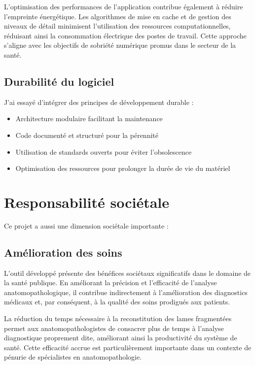 \documentclass[11pt,a4paper]{report}
\begin{document}
L'optimisation des performances de l'application contribue également à réduire l'empreinte énergétique. Les algorithmes de mise en cache et de gestion des niveaux de détail minimisent l'utilisation des ressources computationnelles, réduisant ainsi la consommation électrique des postes de travail. Cette approche s'aligne avec les objectifs de sobriété numérique promus dans le secteur de la santé.

\subsection{Durabilité du logiciel}

J'ai essayé d'intégrer des principes de développement durable :

\begin{itemize}
\item Architecture modulaire facilitant la maintenance
\item Code documenté et structuré pour la pérennité
\item Utilisation de standards ouverts pour éviter l'obsolescence
\item Optimisation des ressources pour prolonger la durée de vie du matériel
\end{itemize}

\section{Responsabilité sociétale}

Ce projet a aussi une dimension sociétale importante :

\subsection{Amélioration des soins}

L'outil développé présente des bénéfices sociétaux significatifs dans le domaine de la santé publique. En améliorant la précision et l'efficacité de l'analyse anatomopathologique, il contribue indirectement à l'amélioration des diagnostics médicaux et, par conséquent, à la qualité des soins prodigués aux patients.

La réduction du temps nécessaire à la reconstitution des lames fragmentées permet aux anatomopathologistes de consacrer plus de temps à l'analyse diagnostique proprement dite, améliorant ainsi la productivité du système de santé. Cette efficacité accrue est particulièrement importante dans un contexte de pénurie de spécialistes en anatomopathologie.
\end{document}
